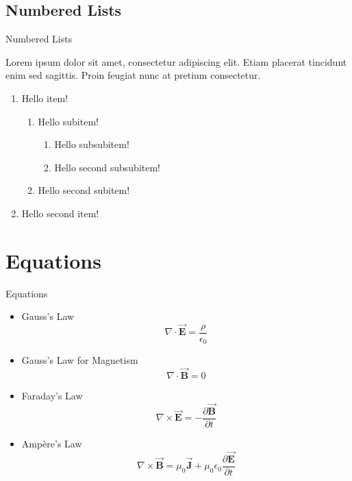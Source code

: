 \documentclass[aspectratio=169]{beamer}
\begin{document}
\subsection{Numbered Lists}
\begin{frame}{Numbered Lists}

Lorem ipsum dolor sit amet, consectetur adipiscing elit. Etiam placerat tincidunt enim sed sagittis. Proin feugiat nunc at pretium consectetur.
    \begin{enumerate}
        \item Hello item!
        \begin{enumerate}
            \item Hello subitem!
            \begin{enumerate}
                \item Hello subsubitem!
                \item Hello second subsubitem!
            \end{enumerate}
            \item Hello second subitem!
        \end{enumerate}
        \item Hello second item!
    \end{enumerate}

\end{frame}

\section{Equations}

\begin{frame}{Equations}

    \begin{itemize}
        \item Gauss's Law
        \begin{equation*}
            \nabla \cdot \overset{\rightarrow}{\textbf{E}} = \frac{\rho}{\epsilon_0}
        \end{equation*}
        \item Gauss's Law for Magnetism
        \begin{equation*}
            \nabla \cdot \overset{\rightarrow}{\textbf{B}} = 0
        \end{equation*}
        \item Faraday's Law
        \begin{equation*}
            \nabla \times \overset{\rightarrow}{\textbf{E}}=- \frac{\partial \overset{\rightarrow}{\textbf{B}}}{\partial t}
        \end{equation*}
        \item Ampère's Law
        \begin{equation*}
            \nabla \times \overset{\rightarrow}{\textbf{B}}=\mu_0\overset{\rightarrow}{\textbf{J}}+\mu_0\epsilon_0\frac{\partial \overset{\rightarrow}{\textbf{E}}}{\partial t}
        \end{equation*}
    \end{itemize}
    
\end{frame}
\end{document}
